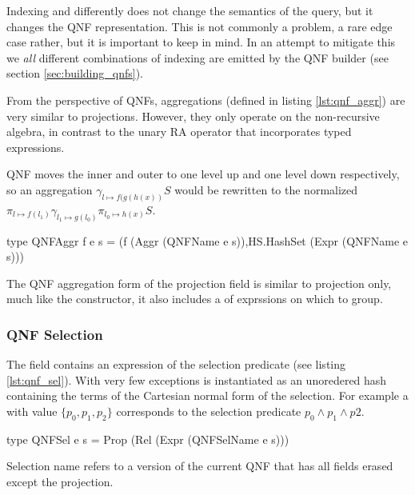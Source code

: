 Indexing  and  differently does not change the
semantics of the query, but it changes the QNF representation. This is
not commonly a problem, a rare edge case rather, but it is important to keep in mind.
In an attempt to mitigate this we \emph{all} different combinations of indexing are emitted by the
QNF builder (see section \ref{sec:building_qnfs}).

From the perspective of QNFs,  aggregations (defined in listing \ref{lst:qnf_aggr})
are very similar to projections. However, they only operate on the non-recursive
 algebra, in contrast to the  unary RA operator that incorporates
 typed expressions.

QNF moves the inner and outer  to one level up and
one level down respectively, so an aggregation \(\gamma_{l \mapsto f(g(h(x))} S\) would be
rewritten to the normalized
\(\pi_{l \mapsto f(l_1)} \gamma_{l_1 \mapsto g(l_0)} \pi_{l_0 \mapsto h(x)} S\).

\begin{code}
  \begin{haskellcode}
    type QNFAggr f e s =
    (f (Aggr (QNFName e s)),HS.HashSet (Expr (QNFName e s)))
  \end{haskellcode}
  \caption{\label{lst:qnf_aggr} The QNF aggregation form of the
    projection field is similar to projection only, much like the
     constructor, it also includes a  of
    exprssions on which to group.}
\end{code}

\subsubsection{QNF Selection}

The  field contains an expression
of the selection predicate (see listing \ref{lst:qnf_sel}). With very few
exceptions  is instantiated as an unoredered hash containing the
terms of the Cartesian normal form of the selection. For example a 
with value \(\{p_0, p_1, p_2\}\) corresponds to the selection predicate
\(p_0 \land p_1 \land p2\).

\begin{code}
  \begin{haskellcode}
    type QNFSel e s = Prop (Rel (Expr (QNFSelName e s)))
  \end{haskellcode}
  \caption{\label{lst:qnf_sel}Selection name refers to a version of
    the current QNF that has all fields erased except the projection.}
\end{code}

